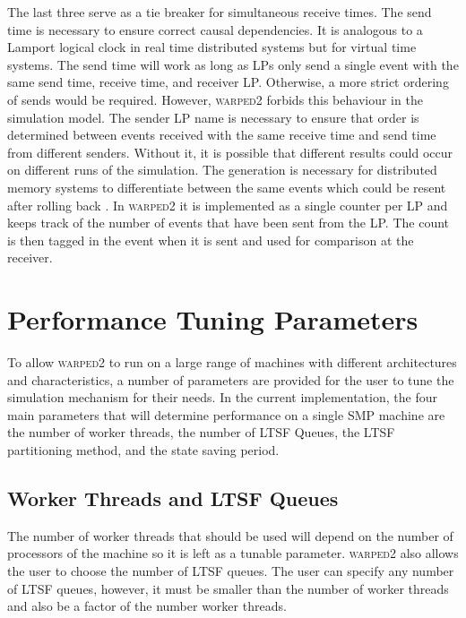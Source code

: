 \documentclass[11pt]{book}
\begin{document}
\noindent %
The last three serve as a tie breaker for simultaneous receive times. The send time is
necessary to ensure correct causal dependencies. It is analogous to a Lamport logical
clock\cite{lamport-78} in real time distributed systems but for virtual time systems. The
send time will work as long as LPs only send a single event with the same send time, receive
time, and receiver LP. Otherwise, a more strict ordering of sends would be required. However,
\textsc{warped2} forbids this behaviour in the simulation model. The sender LP name is necessary
to ensure that order is determined between events received with the same receive time and send
time from different senders. Without it, it is possible that different results could occur on
different runs of the simulation\cite{ronngren-99}. The generation is necessary for distributed
memory systems to differentiate between the same events which could be resent after rolling back
\cite{ronngren-99}. In \textsc{warped2} it is implemented as a single counter per LP and
keeps track of the number of events that have been sent from the LP. The count is then
tagged in the event when it is sent and used for comparison at the receiver.

\section{Performance Tuning Parameters}

To allow \textsc{warped2} to run on a large range of machines with different architectures and
characteristics, a number of parameters are provided for the user to tune the simulation mechanism
for their needs. In the current implementation, the four main parameters that will determine
performance on a single SMP machine are the number of worker threads, the number of LTSF Queues,
the LTSF partitioning method, and the state saving period.

\subsection{Worker Threads and LTSF Queues}

The number of worker threads that should be used will depend on the number of processors of the
machine so it is left as a tunable parameter. \textsc{warped2} also allows the user to choose
the number of LTSF queues. The user can specify any number of LTSF queues, however, it must
be smaller than the number of worker threads and also be a factor of the number worker threads. 
\end{document}
